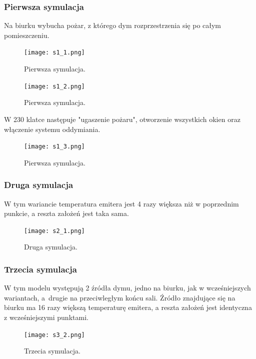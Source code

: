 \documentclass{article}
\begin{document}
	\vspace{4mm}
	\subsubsection{Pierwsza symulacja}
	Na biurku wybucha pożar, z którego dym rozprzestrzenia się po całym pomieszczeniu.
	
	\vspace{7mm}
	\begin{figure}[ht!]
		\centering
		\texttt{[image: s1\_1.png]}
		\caption{Pierwsza symulacja.}
	\end{figure}
	
	\vspace{7mm}
	\begin{figure}[ht!]
		\centering
		\texttt{[image: s1\_2.png]}
		\caption{Pierwsza symulacja.}
	\end{figure}
	
	\newpage
	W 230 klatce następuje "ugaszenie pożaru", otworzenie wszystkich okien oraz włączenie systemu oddymiania.
	
	\vspace{7mm}
	\begin{figure}[ht!]
		\centering
		\texttt{[image: s1\_3.png]}
		\caption{Pierwsza symulacja.}
	\end{figure}
	
	\vspace{2mm}
	\subsubsection{Druga symulacja}
	W tym wariancie temperatura emitera jest 4 razy większa niż w poprzednim punkcie, a reszta założeń jest taka sama.
	
	\vspace{7mm}
	\begin{figure}[ht!]
		\centering
		\texttt{[image: s2\_1.png]}
		\caption{Druga symulacja.}
	\end{figure}
	
	\newpage
	\subsubsection{Trzecia symulacja}
	\medskip
	W tym modelu występują 2 źródła dymu, jedno na biurku, jak w wcześniejszych wariantach, a~drugie na przeciwległym końcu sali. Źródło znajdujące się na biurku ma 16 razy większą temperaturę emitera, a reszta założeń jest identyczna z wcześniejszymi punktami.
	
	\vspace{25mm}
	\begin{figure}[ht!]
		\centering
		\texttt{[image: s3\_2.png]}
		\caption{Trzecia symulacja.}
	\end{figure}
	
\end{document}
